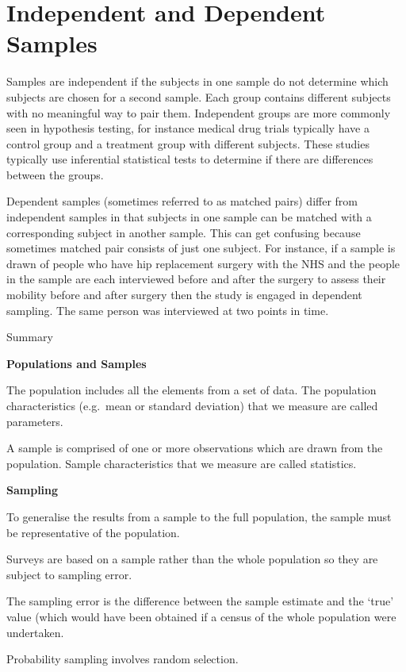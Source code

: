 \documentclass[
]{book}
\begin{document}
\hypertarget{independent-and-dependent-samples}{%
\section{Independent and Dependent Samples}\label{independent-and-dependent-samples}}

Samples are independent if the subjects in one sample do not determine which subjects are chosen for a second sample. Each group contains different subjects with no meaningful way to pair them. Independent groups are more commonly seen in hypothesis testing, for instance medical drug trials typically have a control group and a treatment group with different subjects. These studies typically use inferential statistical tests to determine if there are differences between the groups.

Dependent samples (sometimes referred to as matched pairs) differ from independent samples in that subjects in one sample can be matched with a corresponding subject in another sample. This can get confusing because sometimes matched pair consists of just one subject. For instance, if a sample is drawn of people who have hip replacement surgery with the NHS and the people in the sample are each interviewed before and after the surgery to assess their mobility before and after surgery then the study is engaged in dependent sampling. The same person was interviewed at two points in time.

Summary

\textbf{Populations and Samples}

The population includes all the elements from a set of data. The population characteristics (e.g.~mean or standard deviation) that we measure are called parameters.

A sample is comprised of one or more observations which are drawn from the population. Sample characteristics that we measure are called statistics.

\textbf{Sampling}

To generalise the results from a sample to the full population, the sample must be representative of the population.

Surveys are based on a sample rather than the whole population so they are subject to sampling error.

The sampling error is the difference between the sample estimate and the `true' value (which would have been obtained if a census of the whole population were undertaken.

Probability sampling involves random selection.
\end{document}
